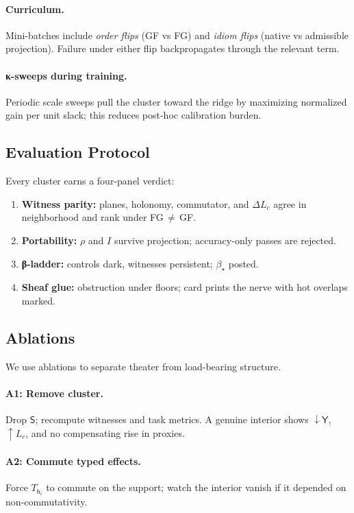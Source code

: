 \documentclass[11pt]{article}
\newcommand{\1}{\mathbf{1}}
\newcommand{\ratio}{\rho}
\newcommand{\rate}{I}
\newcommand{\Blur}{\beta}
\newcommand{\Lc}{L_c}
\newcommand{\Head}{\mathsf{h}}
\newcommand{\Cluster}{\mathsf{S}}
\newcommand{\Yield}{\mathsf{Y}}
\begin{document}
\paragraph{Curriculum.}
Mini-batches include \emph{order flips} (GF vs FG) and \emph{idiom flips} (native vs admissible projection). Failure under either flip backpropagates through the relevant term.

\paragraph{κ-sweeps during training.}
Periodic scale sweeps pull the cluster toward the ridge by maximizing normalized gain per unit slack; this reduces post-hoc calibration burden.

\subsection{Evaluation Protocol}
Every cluster earns a four-panel verdict:

\begin{enumerate}[label=\textbf{E\arabic*}.]
\item \textbf{Witness parity:} planes, holonomy, commutator, and $\Delta \Lc$ agree in neighborhood and rank under FG\,$\ne$\,GF.
\item \textbf{Portability:} \(\ratio\) and \(\rate\) survive projection; accuracy-only passes are rejected.
\item \textbf{β-ladder:} controls dark, witnesses persistent; $\Blur_\star$ posted.
\item \textbf{Sheaf glue:} obstruction under floors; card prints the nerve with hot overlaps marked.
\end{enumerate}

\subsection{Ablations}
We use ablations to separate theater from load-bearing structure.

\paragraph{A1: Remove cluster.}
Drop $\Cluster$; recompute witnesses and task metrics. A genuine interior shows $\downarrow \Yield$, $\uparrow \Lc$, and no compensating rise in proxies.

\paragraph{A2: Commute typed effects.}
Force $T_{\Head_i}$ to commute on the support; watch the interior vanish if it depended on non-commutativity.
\end{document}
